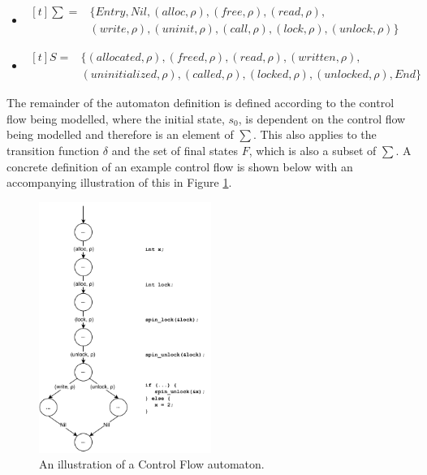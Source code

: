 \begin{itemize}
    \item{
        $
            \begin{aligned}[t] 
                \sum = & \{\mathit{Entry}, \mathit{Nil}, (alloc, \rho), (free, \rho), (read, \rho), \\ & (write, \rho), (uninit, \rho), (call, \rho), (lock, \rho), (unlock, \rho)\}
            \end{aligned} 
        $
    }
    \item{
        $
            \begin{aligned}[t]
                S = & \{(allocated, \rho), (freed, \rho), (read, \rho), (written, \rho),\\ & (uninitialized, \rho), (called, \rho), (locked, \rho), (unlocked, \rho), End\}
            \end{aligned}
        $
    }
\end{itemize}

\noindent The remainder of the automaton definition is defined according to the control flow being modelled, where the initial state, $s_0$, is dependent on the control flow being modelled and therefore is an element of $\sum$. This also applies to the transition function $\delta$ and the set of final states $F$, which is also a subset of $\sum$. A concrete definition of an example control flow is shown below with an accompanying illustration of this in Figure \ref{cfg_example-automaton}.

\begin{figure}[H]
    \centering
    \includegraphics[width=0.5\textwidth]{background/figures/cfg_example}
    \caption{An illustration of a Control Flow automaton.}
    \label{cfg_example-automaton}
\end{figure}


